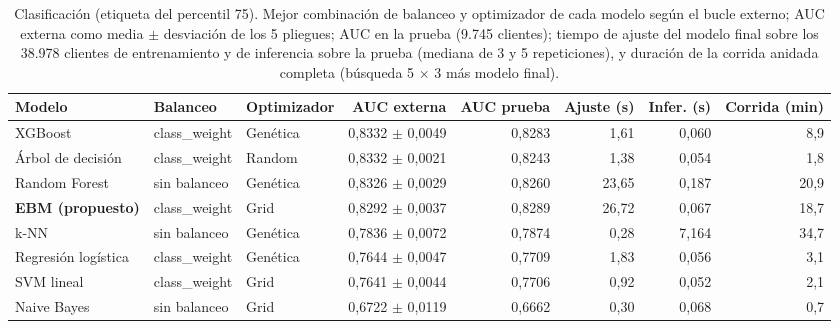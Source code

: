 \begin{table}
\caption{Clasificación (etiqueta del percentil 75). Mejor combinación de balanceo y optimizador de cada modelo según el bucle externo; AUC externa como media $\pm$ desviación de los 5 pliegues; AUC en la prueba (9.745 clientes); tiempo de ajuste del modelo final sobre los 38.978 clientes de entrenamiento y de inferencia sobre la prueba (mediana de 3 y 5 repeticiones), y duración de la corrida anidada completa (búsqueda 5 $\times$ 3 más modelo final).}\label{tab:clasificacion}
\scriptsize\setlength{\tabcolsep}{2.8pt}
\begin{tabular}{lllrrrrr}
\toprule
\textbf{Modelo} & \textbf{Balanceo} & \textbf{Optimizador} & \textbf{AUC externa} & \textbf{AUC prueba} & \textbf{Ajuste (s)} & \textbf{Infer. (s)} & \textbf{Corrida (min)} \\
\midrule
XGBoost & class\_weight & Genética & 0,8332 $\pm$ 0,0049 & 0,8283 & 1,61 & 0,060 & 8,9 \\
Árbol de decisión & class\_weight & Random & 0,8332 $\pm$ 0,0021 & 0,8243 & 1,38 & 0,054 & 1,8 \\
Random Forest & sin balanceo & Genética & 0,8326 $\pm$ 0,0029 & 0,8260 & 23,65 & 0,187 & 20,9 \\
\textbf{EBM (propuesto)} & class\_weight & Grid & 0,8292 $\pm$ 0,0037 & 0,8289 & 26,72 & 0,067 & 18,7 \\
k-NN & sin balanceo & Genética & 0,7836 $\pm$ 0,0072 & 0,7874 & 0,28 & 7,164 & 34,7 \\
Regresión logística & class\_weight & Genética & 0,7644 $\pm$ 0,0047 & 0,7709 & 1,83 & 0,056 & 3,1 \\
SVM lineal & class\_weight & Grid & 0,7641 $\pm$ 0,0044 & 0,7706 & 0,92 & 0,052 & 2,1 \\
Naive Bayes & sin balanceo & Grid & 0,6722 $\pm$ 0,0119 & 0,6662 & 0,30 & 0,068 & 0,7 \\
\bottomrule
\end{tabular}
\end{table}
